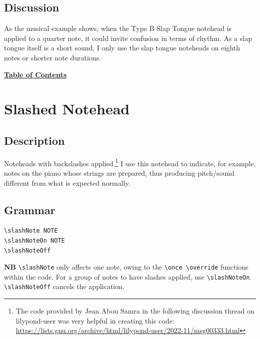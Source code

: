 \subsection{Discussion}
As the musical example shows, when the Type B Slap Tongue notehead is applied to a quarter note, it could invite confusion in terms of rhythm. As a slap tongue itself is a short sound, I only use the slap tongue noteheads on eighth notes or shorter note durations. \par
\hyperref[sec:toc]{\textbf{Table of Contents}}

\vfill \break


\section {Slashed Notehead}
\hfill
\subsection{Description}
Noteheads with backslashes applied.\footnote{The code provided by Jean Abou Samra in the following discussion thread on lilypond-user was very helpful in creating this code: \url{https://lists.gnu.org/archive/html/lilypond-user/2022-11/msg00333.html}} I use this notehead to indicate, for example, notes on the piano whose strings are prepared, thus producing pitch/sound different from what is expected normally. 

\subsection{Grammar}
\begin{verbatim}
\slashNote NOTE
\slashNoteOn NOTE
\slashNoteOff 
\end{verbatim}
\textbf{NB} \verb|\slashNote| only affects one note, owing to the \verb|\once \override| functions within the code. For a group of notes to have slashes applied, use \verb|\slashNoteOn|. \verb|\slashNoteOff| cancels the application.
